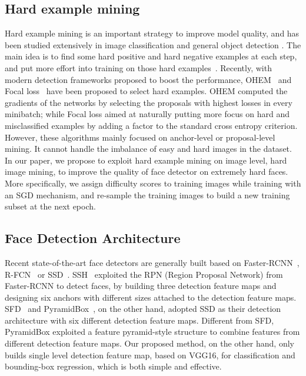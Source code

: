 \documentclass[10pt,twocolumn,letterpaper]{article}
\begin{document}
\subsection{Hard example mining}
Hard example mining is an important strategy to improve model quality, and
has been studied extensively in image classification \cite{loshchilov2015online} and general object detection \cite{lin2018focal,shrivastava2016training}. The main idea is to find some hard positive and
hard negative examples at each step, and put more effort into training on those hard
examples~\cite{rowley1998neural,viola2001rapid}. Recently, with modern detection
frameworks proposed to boost the performance, OHEM~\cite{shrivastava2016training} and Focal loss~\cite{lin2018focal} have been proposed to select hard examples. OHEM computed the gradients of the networks by
selecting the proposals with highest losses in every minibatch; while Focal loss aimed at naturally putting more focus on hard and
misclassified examples by adding a factor to the standard cross entropy criterion.
However, these algorithms mainly focused on anchor-level or proposal-level mining. It cannot handle the
imbalance of easy and hard images in the dataset.
In our paper, we propose to exploit hard
example mining on image level, \ie hard image mining, to improve the quality of face detector on extremely hard faces. More specifically,
we assign difficulty scores to training images while training with an SGD mechanism,
and re-sample the training images to build a new training subset at the next epoch.

\subsection{Face Detection Architecture}
Recent state-of-the-art face detectors are generally built based on Faster-RCNN~\cite{ren2015faster}, R-FCN~\cite{dai2016r} or SSD~\cite{liu2016ssd}.
SSH~\cite{najibi2017ssh} exploited the RPN (Region Proposal Network) from Faster-RCNN to detect faces, by
building three detection feature maps and designing six anchors with different
sizes attached to the detection feature maps. SFD~\cite{zhang2017s} and
PyramidBox~\cite{Tang_2018_ECCV}, on the other hand,
adopted SSD as their detection architecture with six different detection feature maps.
Different from SFD, PyramidBox exploited a feature pyramid-style structure
to combine features from different detection feature maps. Our proposed method, on the other
hand, only builds single level detection feature map, based on VGG16,
for classification and bounding-box regression, which is both simple and effective.
\end{document}
